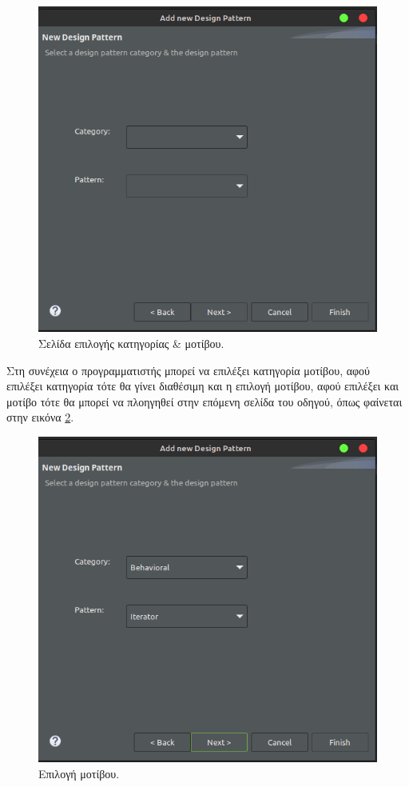 \begin{figure}[H]
    \centering
    \includegraphics[width=1.0\textwidth]{Figures/select_pattern.png}
    \caption{Σελίδα επιλογής κατηγορίας \& μοτίβου.}
    \label{fig:select_pattern}
\end{figure}
Στη συνέχεια ο προγραμματιστής μπορεί να επιλέξει κατηγορία μοτίβου, αφού επιλέξει κατηγορία τότε θα γίνει διαθέσιμη και η επιλογή μοτίβου, 
αφού επιλέξει και μοτίβο τότε θα μπορεί να πλοηγηθεί στην επόμενη σελίδα του οδηγού, όπως φαίνεται στην εικόνα \ref{fig:select_pattern1}.
\begin{figure}[H]
    \centering
    \includegraphics[width=1.0\textwidth]{Figures/select_pattern1.png}
    \caption{Επιλογή μοτίβου.}
    \label{fig:select_pattern1}
\end{figure}
